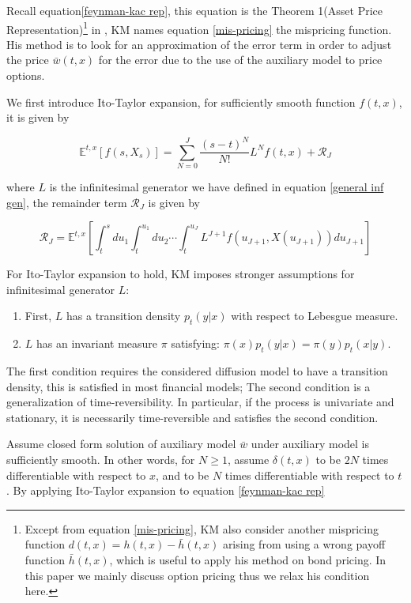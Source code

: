 Recall equation\eqref{feynman-kac rep}, this equation is the Theorem 1(Asset Price Representation)\footnote{Except from equation \eqref{mis-pricing}, KM also consider another mispricing function $d(t,x)=h(t,x)-\bar{h}(t,x)$ arising from using a wrong payoff function $\bar{h}(t,x)$, which is useful to apply his method on bond pricing. In this paper we mainly discuss option pricing thus we relax his condition here.} in \cite{kristensen_adding_2011}, KM names equation \eqref{mis-pricing} the mispricing function. His method is to look for an approximation of the error term in order to adjust the price $\bar{w}(t,x)$ for the error due to the use of the auxiliary model to price options.

We first introduce Ito-Taylor expansion, for sufficiently smooth function $f(t,x)$, it is given by

\begin{equation}
    \mathbb{E}^{t, x}[f(s, X_s)]=\sum_{N=0}^{J} \frac{(s-t)^{N}}{N !}L^N f(t, x)+\mathcal{R}_{J}
\end{equation}

\noindent where $L$ is the infinitesimal generator we have defined in equation \eqref{general inf gen}, the remainder term $\mathcal{R}_{J}$ is given by

\begin{equation}
    \mathcal{R}_{J}=\mathbb{E}^{t, x}\left[\int_{t}^{s} d u_{1} \int_{t}^{u_{1}} d u_{2} \cdots \int_{t}^{u_{J}}L^{J+1} f\left(u_{J+1}, X\left(u_{J+1}\right)\right) d u_{J+1}\right]
\end{equation}

For Ito-Taylor expansion to hold, KM imposes stronger assumptions for infinitesimal generator $L$:

\begin{enumerate}
    \item First, $L$ has a transition density $p_t(y|x)$ with respect to Lebesgue measure.
    \item $L$ has an invariant measure $\pi$ satisfying: $\pi(x)p_t(y|x) = \pi(y)p_t(x|y)$.
\end{enumerate}

\noindent The first condition requires the considered diffusion model to have a transition density, this is satisfied in most financial models; The second condition is a generalization of time-reversibility. In particular, if the process is univariate and stationary, it is necessarily time-reversible and satisfies the second condition.

Assume closed form solution of auxiliary model $\bar{w}$ under auxiliary model is sufficiently smooth. In other words, for $N \geq 1$, assume $\delta(t,x)$ to be $2N$ times differentiable with respect to $x$, and to be $N$ times differentiable with respect to $t$. By applying Ito-Taylor expansion to equation \eqref{feynman-kac rep}

